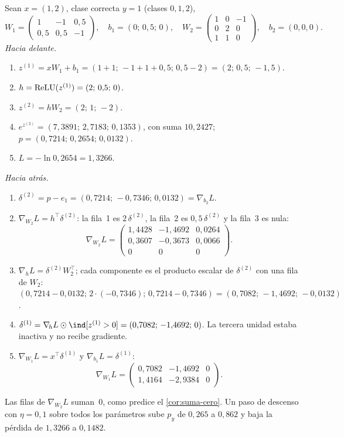 \begin{ejemplo}\label{ej:backprop}
Sean $x=(1,2)$, clase correcta $y=1$ (clases $0,1,2$),
\[
W_1=\begin{pmatrix}1&-1&0{,}5\\0{,}5&0{,}5&-1\end{pmatrix},\quad b_1=(0;\,0{,}5;\,0),\quad
W_2=\begin{pmatrix}1&0&-1\\0&2&0\\1&1&0\end{pmatrix},\quad b_2=(0,0,0).
\]
\emph{Hacia delante.}
\begin{enumerate}[label=\arabic*.]
  \item $z^{(1)}=xW_1+b_1=(1+1;\,-1+1+0{,}5;\,0{,}5-2)=(2;\,0{,}5;\,-1{,}5)$.
  \item $h=\operatorname{ReLU}(z^{(1)})=(2;\,0{,}5;\,0)$.
  \item $z^{(2)}=hW_2=(2;\,1;\,-2)$.
  \item $e^{z^{(2)}}=(7{,}3891;\,2{,}7183;\,0{,}1353)$, con suma $10{,}2427$; $p=(0{,}7214;\,0{,}2654;\,0{,}0132)$.
  \item $L=-\ln 0{,}2654=1{,}3266$.
\end{enumerate}
\emph{Hacia atrás.}
\begin{enumerate}[label=\arabic*.]
  \item $\delta^{(2)}=p-e_1=(0{,}7214;\,-0{,}7346;\,0{,}0132)=\nabla_{\!b_2}L$.
  \item $\nabla_{\!W_2}L=h^{\top}\delta^{(2)}$: la fila~1 es $2\,\delta^{(2)}$, la fila~2 es $0{,}5\,\delta^{(2)}$ y la fila~3 es nula:
  \[
  \nabla_{\!W_2}L=\begin{pmatrix}1{,}4428&-1{,}4692&0{,}0264\\0{,}3607&-0{,}3673&0{,}0066\\0&0&0\end{pmatrix}.
  \]
  \item $\nabla_{\!h}L=\delta^{(2)}W_2^{\top}$; cada componente es el producto escalar de $\delta^{(2)}$ con una fila de $W_2$: $(0{,}7214-0{,}0132;\,2\cdot(-0{,}7346);\,0{,}7214-0{,}7346)=(0{,}7082;\,-1{,}4692;\,-0{,}0132)$.
  \item $\delta^{(1)}=\nabla_{\!h}L\odot\ind[z^{(1)}>0]=(0{,}7082;\,-1{,}4692;\,0)$. La tercera unidad estaba inactiva y no recibe gradiente.
  \item $\nabla_{\!W_1}L=x^{\top}\delta^{(1)}$ y $\nabla_{\!b_1}L=\delta^{(1)}$:
  \[
  \nabla_{\!W_1}L=\begin{pmatrix}0{,}7082&-1{,}4692&0\\1{,}4164&-2{,}9384&0\end{pmatrix}.
  \]
\end{enumerate}
Las filas de $\nabla_{\!W_2}L$ suman~0, como predice el \cref{cor:suma-cero}. Un paso de descenso con $\eta=0{,}1$ sobre todos los parámetros sube $p_y$ de $0{,}265$ a $0{,}862$ y baja la pérdida de $1{,}3266$ a $0{,}1482$.
\end{ejemplo}

